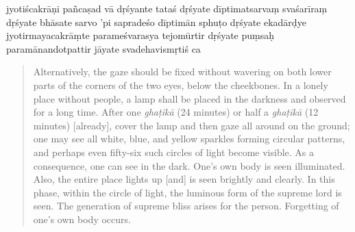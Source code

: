 \begin{itquote}
\begin{ekdosis}
 jyotiścakrāṇi pañcaṣad vā dṛśyante \normalpipe  
 tataś
 dṛśyate \normalpipe  
 dīptimatsarvaṃ svaśarīraṃ dṛśyate bhāsate sarvo 'pi sapradeśo dīptimān sphuṭo dṛśyate \normalpipe  
 ekadārḍye jyotirmayacakrāṃte parameśvarasya tejomūrtir dṛśyate \normalpipe  
puṃsaḥ paramānandotpattir jāyate \normalpipe  
svadehavismṛtiś ca
 \normalpipe   
\end{ekdosis}
\end{itquote}
\begin{quote}
 Alternatively, the gaze should be fixed without wavering on both lower parts of the corners of the two eyes, below the cheekbones. In a lonely place without people, a lamp shall be placed in the darkness and observed for a long time. After one \textit{ghaṭikā} (24 minutes) or half a \textit{ghaṭikā} (12 minutes) [already], cover the lamp and then gaze all around on the ground; one may see all white, blue, and yellow sparkles forming circular patterns, and perhaps even fifty-six such circles of light become visible. As a consequence, one can see in the dark. One’s own body is seen illuminated. Also, the entire place lights up [and] is seen brightly and clearly. In this phase, within the circle of light, the luminous form of the supreme lord is seen. The generation of supreme bliss arises for the person. Forgetting of one’s own body occurs.
\end{quote} 
